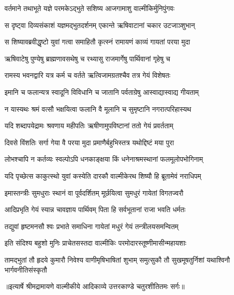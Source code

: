\twolineshloka
{वर्तमाने तथाभूते यज्ञे परमकेऽद्भुते}
{सशिष्य आजगामाशु वाल्मीकिर्मुनिपुंगवः} %

\twolineshloka
{स दृष्ट्वा दिव्यसंकाशं यज्ञमद्भुतदर्शनम्}
{एकान्ते ऋषिवाटानां चकार उटजाञ्शुभान्} %

\twolineshloka
{स शिष्यावब्रवीद्धृष्टो युवां गत्वा समाहितौ}
{कृत्स्नं रामायणं काव्यं गायतां परया मुदा} %

\twolineshloka
{ऋषिवाटेषु पुण्येषु ब्राह्मणावसथेषु च}
{रथ्यासु राजमार्गेषु पार्थिवानां गृहेषु च} %

\twolineshloka
{रामस्य भवनद्वारि यत्र कर्म च वर्तते}
{ऋत्विजामग्रतश्चैव तत्र गेयं विशेषतः} %

\twolineshloka
{इमानि च फलान्यत्र स्वादूनि विविधानि च}
{जातानि पर्वताग्रेषु आस्वाद्यास्वाद्य गीयताम्} %

\twolineshloka
{न यास्यथः श्रमं वत्सौ भक्षयित्वा फलानि वै}
{मूलानि च सुमृष्टानि नगरात्परिहास्यथ} %

\twolineshloka
{यदि शब्दापयेद्रामः श्रवणाय महीपतिः}
{ऋषीणामुपविष्टानां ततो गेयं प्रवर्तताम्} %

\twolineshloka
{दिवसे विंशतिः सर्गा गेया वै परया मुदा}
{प्रमाणैर्बहुभिस्तत्र यथोद्दिष्टं मया पुरा} %

\twolineshloka
{लोभश्चापि न कर्तव्यः स्वल्पोऽपि धनकाङ्क्षया}
{किं धनेनाश्रमस्थानां फलमूलोपभोगिनाम्} %

\twolineshloka
{यदि पृच्छेत्स काकुत्स्थो युवां कस्येति दारकौ}
{वाल्मीकेरथ शिष्यौ हि ब्रूतामेवं नराधिपम्} %

\twolineshloka
{इमास्तन्त्रीः सुमधुराः स्थानं वा पूर्वदर्शितम्}
{मूर्छयित्वा सुमधुरं गायेतां विगतज्वरौ} %

\twolineshloka
{आदिप्रभृति गेयं स्यान्न चावज्ञाय पार्थिवम्}
{पिता हि सर्वभूतानां राजा भवति धर्मतः} %

\twolineshloka
{तद्युवां हृष्टमनसौ श्वः प्रभाते समाधिना}
{गायेतां मधुरं गेयं तन्त्रीलयसमन्वितम्} %

\twolineshloka
{इति संदिश्य बहुशो मुनिः प्राचेतसस्तदा}
{वाल्मीकिः परमोदारस्तूष्णीमासीन्महायशाः} %

\fourlineindentedshloka
{तामद्भुतां तौ हृदये कुमारौ}
{ निवेश्य वाणीमृषिभाषितां शुभाम्}
{समुत्सुकौ तौ सुखमूषतुर्निशां}
{ यथाश्विनौ भार्गवनीतिसंस्कृतौ} %


{॥इत्यार्षे श्रीमद्रामायणे वाल्मीकीये आदिकाव्ये उत्तरकाण्डे चतुरशीतितमः सर्गः॥}


